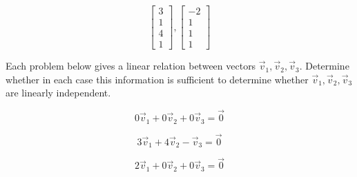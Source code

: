 \documentclass{ximera}
\begin{document}
\begin{problem}
\begin{problem}
\begin{multipleChoice}
 \end{multipleChoice}
\end{problem}

\begin{problem}
$$\begin{bmatrix}3\\1\\4\\1\end{bmatrix}, \begin{bmatrix}-2\\1\\1\\1\end{bmatrix}$$

\begin{multipleChoice}
 \end{multipleChoice}
\end{problem}

\end{problem}


\begin{problem}
Each problem below gives a linear relation between vectors $\vec{v}_1, \vec{v}_2, \vec{v}_3$.  Determine whether in each case this information is sufficient to determine whether $\vec{v}_1, \vec{v}_2, \vec{v}_3$ are linearly independent.

\begin{problem}
$$0\vec{v}_1+ 0\vec{v}_2+ 0\vec{v}_3=\vec{0}$$
\begin{multipleChoice}
 \end{multipleChoice}
\end{problem}

\begin{problem}
$$3\vec{v}_1+ 4\vec{v}_2- \vec{v}_3=\vec{0}$$
\begin{multipleChoice}
 \end{multipleChoice}
\end{problem}

\begin{problem}
$$2\vec{v}_1+ 0\vec{v}_2+ 0\vec{v}_3=\vec{0}$$
\begin{multipleChoice}
 \end{multipleChoice}
\end{problem}

\end{problem}
\end{document}
